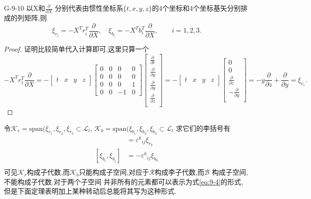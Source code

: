 \documentclass[../main.tex]{subfiles}
\begin{document}
\begin{theorem}{}{G-9-10}
  以X和$\frac{\partial }{\partial X} $ 分别代表由惯性坐标系$\{t,x,y,z\}$的4个坐标和4个坐标基矢分别排成的列矩阵,则 \[
    \xi_{r_i} = - X^T r_i^T \frac{\partial   }{\partial X}, \quad \xi_{b_i} = - X^T b_i^T \frac{\partial   }{\partial X}, \qquad i = 1,2,3
  .\] 
\end{theorem}
\begin{proof}
 证明比较简单代入计算即可,这里只算一个\[
   -X^Tr_1^T \frac{\partial   }{\partial X}
   = -\begin{bmatrix} t&x&y&z \end{bmatrix}  
   \begin{bmatrix} 0&0&0&0\\ 0&0&0&0\\ 0&0&0&1\\0&0&-1&0 \end{bmatrix} 
   \begin{bmatrix} \frac{\partial   }{\partial t} \\ \frac{\partial   }{\partial y} \\\frac{\partial   }{\partial y} \\\frac{\partial   }{\partial z} \\\end{bmatrix} 
  = -\begin{bmatrix} t&x&y&z \end{bmatrix} 
   \begin{bmatrix} 0\\ 0 \\\frac{\partial   }{\partial z} \\-\frac{\partial   }{\partial y} \\ \end{bmatrix} 
   = -y \frac{\partial   }{\partial z} + \frac{\partial   }{\partial y}   = \xi_{r_1} 
   .\]
\end{proof}
令$\mathscr{K}_r = \text{span}(\xi_{r_1},\xi_{r_2},\xi_{r_3}\subset \mathscr{L}_l$, 
$\mathscr{K}_b = \text{span}(\xi_{b_1},\xi_{b_2},\xi_{b_3}\subset \mathscr{L}_l$
求它们的李括号有
\begin{align*}
  [\xi_{r_i},\xi_{r_j}] &= \varepsilon^{k}{}_{ij}\xi_{r_k}\\
  [\xi_{b_i},\xi_{b_j}] &= -\varepsilon^{k}{}_{ij}\xi_{b_k}\\
\end{align*}
可见$\mathscr{K}_r$构成子代数,而$\mathscr{K}_b$只能构成子空间,对应于$\mathscr{R}$构成李子代数,而$\mathscr{B}$ 构成子空间,不能构成子代数.对于两个子空间
并非所有的元素都可以表示为式\ref{eq:9-4}的形式,但是下面定理表明加上某种转动后总能将其写为这种形式.
\end{document}
